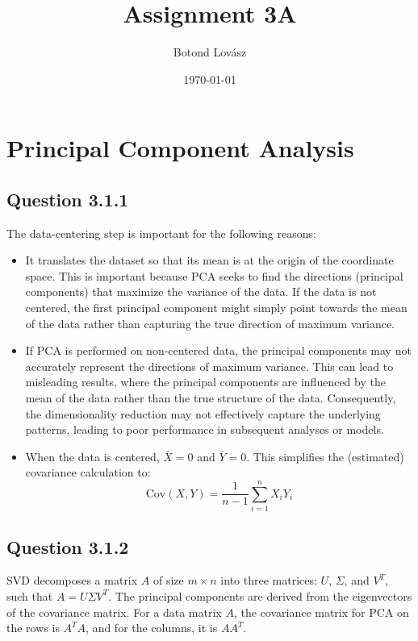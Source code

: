 \documentclass{article}
\title{Assignment 3A}
\author{Botond Lovász}
\date{\today}
\begin{document}
\maketitle

\section{Principal Component Analysis}

\subsection{Question 3.1.1}

The data-centering step is important for the following reasons:

\begin{itemize}
    \item It translates the dataset so that its mean is at the origin of the coordinate space. This is important because PCA seeks to find the directions (principal components) that maximize the variance of the data. If the data is not centered, the first principal component might simply point towards the mean of the data rather than capturing the true direction of maximum variance.

    \item If PCA is performed on non-centered data, the principal components may not accurately represent the directions of maximum variance. This can lead to misleading results, where the principal components are influenced by the mean of the data rather than the true structure of the data. Consequently, the dimensionality reduction may not effectively capture the underlying patterns, leading to poor performance in subsequent analyses or models.
    
    \item When the data is centered, \(\bar{X} = 0\) and \(\bar{Y} = 0\). This simplifies the (estimated) covariance calculation to:
    \[
    \text{Cov}(X, Y) = \frac{1}{n-1} \sum_{i=1}^{n} X_i Y_i
    \]
\end{itemize}


\subsection{Question 3.1.2}

SVD decomposes a matrix \( A \) of size \( m \times n \) into three matrices: \( U \), \( \Sigma \), and \( V^T \), such that \( A = U \Sigma V^T \). The principal components are derived from the eigenvectors of the covariance matrix. For a data matrix \( A \), the covariance matrix for PCA on the rows is \( A^T A \), and for the columns, it is \( A A^T \).
\end{document}
